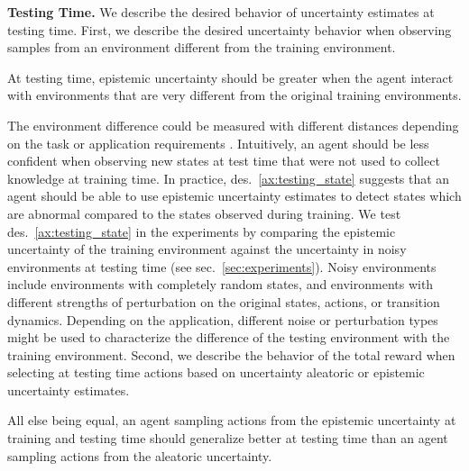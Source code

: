 \textbf{Testing Time.} We describe the desired behavior of uncertainty estimates at testing time. First, we describe the desired uncertainty behavior when observing samples from an environment different from the training environment.
\begin{desiderata}
    \label{ax:testing_state}
    At testing time, epistemic uncertainty should be greater when the agent interact with environments that are very different from the original training environments.
\end{desiderata}
\vspace{-2mm}
The environment difference could be measured with different distances depending on the task or application requirements \cite{domain-shifts-rl}. Intuitively, an agent should be less confident when observing new states at test time that were not used to collect knowledge at training time. In practice, des.~\ref{ax:testing_state} suggests that an agent should be able to use epistemic uncertainty estimates to detect states which are abnormal compared to the states observed during training. We test des.~\ref{ax:testing_state} in the experiments by comparing the epistemic uncertainty of the training environment against the uncertainty in noisy environments at testing time (see sec.~\ref{sec:experiments}). Noisy environments include environments with completely random states, and environments with different strengths of perturbation on the original states, actions, or transition dynamics. Depending on the application, different noise or perturbation types might be used to characterize the difference of the testing environment with the training environment. Second, we describe the behavior of the total reward when selecting at testing time actions based on uncertainty aleatoric or epistemic uncertainty estimates.
\begin{desiderata}
    \label{ax:testing_strategy}
    All else being equal, an agent sampling actions from the epistemic uncertainty at training and testing time should generalize better at testing time than an agent sampling actions from the aleatoric uncertainty.
\end{desiderata}
\vspace{-2mm}
